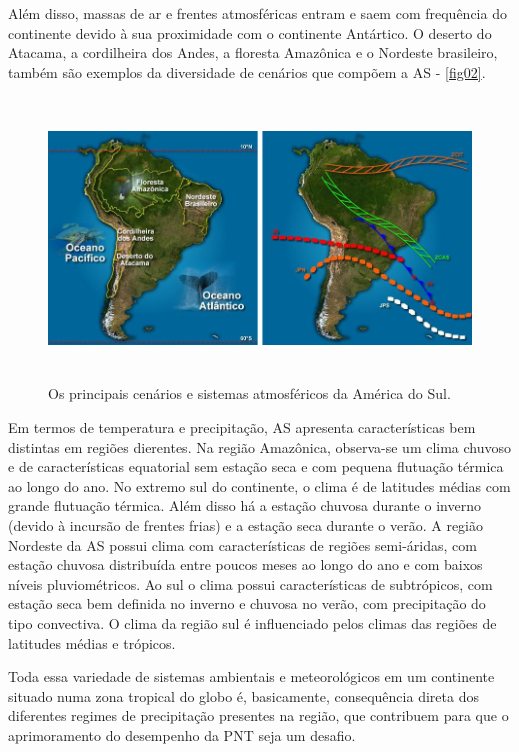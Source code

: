 Além disso, massas de ar e frentes atmosféricas entram e saem com frequência do continente devido à sua proximidade com o continente Antártico. O deserto do Atacama, a cordilheira dos Andes, a floresta Amazônica e o Nordeste brasileiro, também são exemplos da diversidade de cenários que compõem a AS - \autoref{fig02}.

\begin{figure}
\centering
\includegraphics[height=7.5cm]{./figs/fig02.png}
\caption{Os principais cenários e sistemas atmosféricos da América do Sul.}
\label{fig02}
\end{figure}

Em termos de temperatura e precipitação, AS apresenta características bem distintas em regiões dierentes. Na região Amazônica, observa-se um clima chuvoso e de características equatorial sem estação seca e com pequena flutuação térmica ao longo do ano. No extremo sul do continente, o clima é de latitudes médias com grande flutuação térmica. Além disso há a estação chuvosa durante o inverno (\-de\-vi\-do à incursão de frentes frias) e a estação seca durante o verão. A região Nordeste da AS possui clima com características de regiões semi-áridas, com estação chuvosa distribuída entre poucos meses ao longo do ano e com baixos níveis pluviométricos. Ao sul o clima possui características de subtrópicos, com estação seca bem definida no inverno e chuvosa no verão, com precipitação do tipo convectiva. O clima da região sul é influenciado pelos climas das regiões de latitudes médias e trópicos.

Toda essa variedade de sistemas ambientais e meteorológicos em um continente situado numa zona tropical do globo é, basicamente, consequência direta dos diferentes regimes de precipitação presentes na região, que contribuem para que o aprimoramento do desempenho da PNT seja um desafio.

